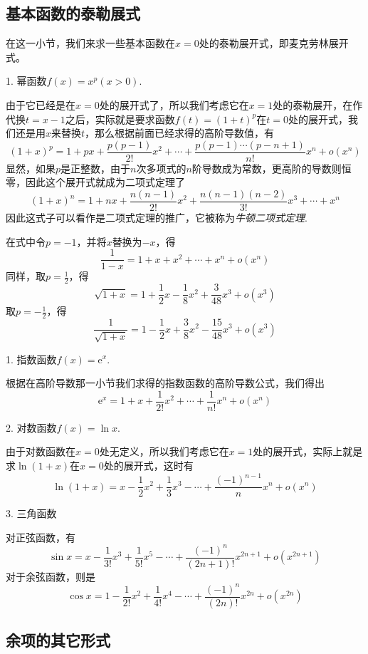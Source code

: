 \subsection{基本函数的泰勒展式}
\label{sec:taylor-expand-for-fundation-function}

在这一小节，我们来求一些基本函数在$x=0$处的泰勒展开式，即麦克劳林展开式。

1. 幂函数$f(x)=x^p(x>0)$.

由于它已经是在$x=0$处的展开式了，所以我们考虑它在$x=1$处的泰勒展开，在作代换$t=x-1$之后，实际就是要求函数$f(t)=(1+t)^p$在$t=0$处的展开式，我们还是用$x$来替换$t$，那么根据前面已经求得的高阶导数值，有
\[ (1+x)^p = 1 + px + \frac{p(p-1)}{2!}x^2 + \cdots + \frac{p(p-1)\cdots (p-n+1)}{n!}x^n + o(x^n) \]
显然，如果$p$是正整数，由于$n$次多项式的$n$阶导数成为常数，更高阶的导数则恒零，因此这个展开式就成为二项式定理了
\[ (1+x)^n = 1+nx + \frac{n(n-1)}{2!}x^2 + \frac{n(n-1)(n-2)}{3!}x^3 + \cdots + x^n \]
因此这式子可以看作是二项式定理的推广，它被称为\emph{牛顿二项式定理}.

在式中令$p=-1$，并将$x$替换为$-x$，得
\[ \frac{1}{1-x} = 1+x+x^2 + \cdots + x^n + o(x^n) \]
同样，取$p=\frac{1}{2}$，得
\[ \sqrt{1+x} = 1+\frac{1}{2}x-\frac{1}{8}x^2+\frac{3}{48}x^3 + o(x^3) \]
取$p=-\frac{1}{2}$，得
\[ \frac{1}{\sqrt{1+x}} = 1-\frac{1}{2}x+\frac{3}{8}x^2 -\frac{15}{48}x^3 + o(x^3) \]

1. 指数函数$f(x)=\mathrm{e}^x$.

根据在高阶导数那一小节我们求得的指数函数的高阶导数公式，我们得出
\[ \mathrm{e}^x = 1+x+\frac{1}{2!}x^2 + \cdots + \frac{1}{n!}x^n + o(x^n) \]

2. 对数函数$f(x)=\ln{x}$.

由于对数函数在$x=0$处无定义，所以我们考虑它在$x=1$处的展开式，实际上就是求$\ln{(1+x)}$在$x=0$处的展开式，这时有
\[ \ln{(1+x)} = x - \frac{1}{2} x^2 + \frac{1}{3} x^3 - \cdots + \frac{(-1)^{n-1}}{n}x^n + o(x^n) \]

3. 三角函数

对正弦函数，有
\[ \sin{x} = x - \frac{1}{3!}x^3 + \frac{1}{5!} x^5 - \cdots + \frac{(-1)^n}{(2n+1)!}x^{2n+1} + o(x^{2n+1}) \]
对于余弦函数，则是
\[ \cos{x} = 1 - \frac{1}{2!}x^2 + \frac{1}{4!}x^4 - \cdots + \frac{(-1)^n}{(2n)!}x^{2n} + o(x^{2n}) \]

\subsection{余项的其它形式}
\label{sec:other-format-of-taylor-additional}




